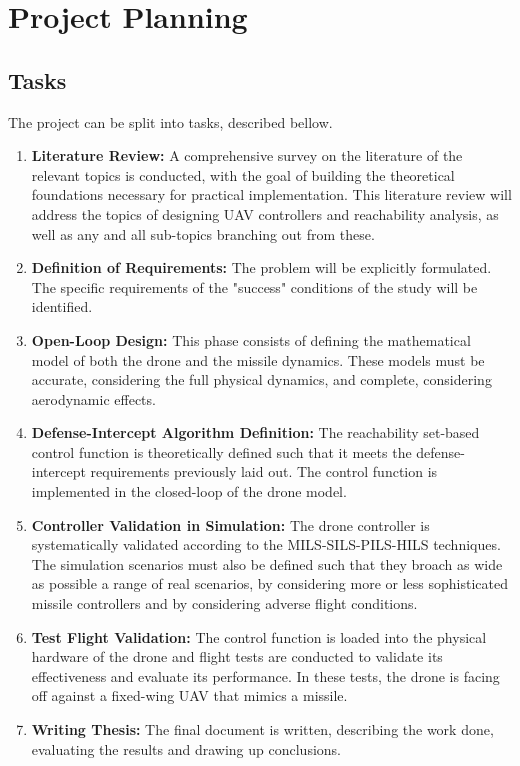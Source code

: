 
%

\chapter{Project Planning}
\label{ch:project_planning}

\section{Tasks}
\label{sec:tasks}

The project can be split into tasks, described bellow.

\begin{enumerate}
    \item \textbf{Literature Review:} A comprehensive survey on the literature of the relevant topics is conducted, with the goal of building the theoretical foundations necessary for practical implementation. This literature review will address the topics of designing UAV controllers and reachability analysis, as well as any and all sub-topics branching out from these.
    \item \textbf{Definition of Requirements:} The problem will be explicitly formulated. The specific requirements of the "success" conditions of the study will be identified.
    \item \textbf{Open-Loop Design:} This phase consists of defining the mathematical model of both the drone and the missile dynamics. These models must be accurate, considering the full physical dynamics, and complete, considering aerodynamic effects. 
    \item \textbf{Defense-Intercept Algorithm Definition:} The reachability set-based control function is theoretically defined such that it meets the defense-intercept requirements previously laid out. The control function is implemented in the closed-loop of the drone model.
    \item \textbf{Controller Validation in Simulation:} The drone controller is systematically validated according to the MILS-SILS-PILS-HILS techniques. The simulation scenarios must also be defined such that they broach as wide as possible a range of real scenarios, by considering more or less sophisticated missile controllers and by considering adverse flight conditions.
    \item \textbf{Test Flight Validation:} The control function is loaded into the physical hardware of the drone and flight tests are conducted to validate its effectiveness and evaluate its performance. In these tests, the drone is facing off against a fixed-wing UAV that mimics a missile.
    \item \textbf{Writing Thesis:} The final document is written, describing the work done, evaluating the results and drawing up conclusions.
\end{enumerate}


